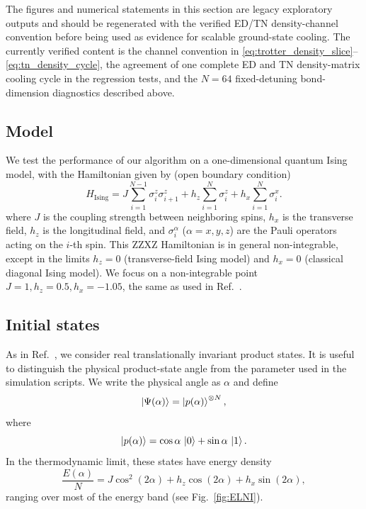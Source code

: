 \documentclass[aps,pra,twocolumn,superscriptaddress,nolongbibliography,nobalancelastpage,10pt]{revtex4-2}
\begin{document}
The figures and numerical statements in this section are legacy exploratory
outputs and should be regenerated with the verified ED/TN density-channel
convention before being used as evidence for scalable ground-state cooling.
The currently verified content is the channel convention in
\eqref{eq:trotter_density_slice}--\eqref{eq:tn_density_cycle}, the agreement of
one complete ED and TN density-matrix cooling cycle in the regression tests,
and the \(N=64\) fixed-detuning bond-dimension diagnostics described above.

\subsection{Model}
We test the performance of our algorithm on a one-dimensional quantum Ising model, with the Hamiltonian given by (open boundary condition)
\begin{equation}
	H_{\text{Ising}} = J\sum_{i=1}^{N-1}\sigma_{i}^z\sigma_{i+1}^z + h_z\sum_{i=1}^{N} \sigma_{i}^z + h_x\sum_{i=1}^{N} \sigma_{i}^x.
	\label{eq:HIsing}
\end{equation}
where $J$ is the coupling strength between neighboring spins, $h_x$ is the transverse field, $h_z$ is the longitudinal field, and $\sigma_i^{\alpha}$ ($\alpha = x,y,z$) are the Pauli operators acting on the $i$-th spin.
This ZZXZ Hamiltonian is in general non-integrable, except in the limits $h_z = 0$ (transverse-field Ising model) and $h_x = 0$ (classical diagonal Ising model). We focus on a non-integrable point $J = 1,h_z = 0.5,h_x = -1.05$, the same as used in Ref.~\citep{Lu2021Algorithms}.

\subsection{Initial states}
As in Ref.~\citep{Lu2021Algorithms}, we consider real translationally invariant product states. It is useful to distinguish the physical product-state angle from the parameter used in the simulation scripts. We write the physical angle as $\alpha$ and define
\begin{equation}
	\ket{\Psi(\alpha)} = \ket{p(\alpha)}^{\otimes N},
	\label{eq:PS}
\end{equation}
where
\begin{equation}
	\ket{p(\alpha)} = \cos\alpha\,\ket{0} + \sin\alpha\,\ket{1}.
\end{equation}
In the thermodynamic limit, these states have energy density
\begin{equation}
	\frac{E(\alpha)}{N}
	= J\cos^2(2\alpha) + h_z \cos(2\alpha) + h_x \sin(2\alpha),
	\label{eq:product-state-energy-alpha}
\end{equation}
ranging over most of the energy band (see Fig.~\ref{fig:ELNI}).
\end{document}
